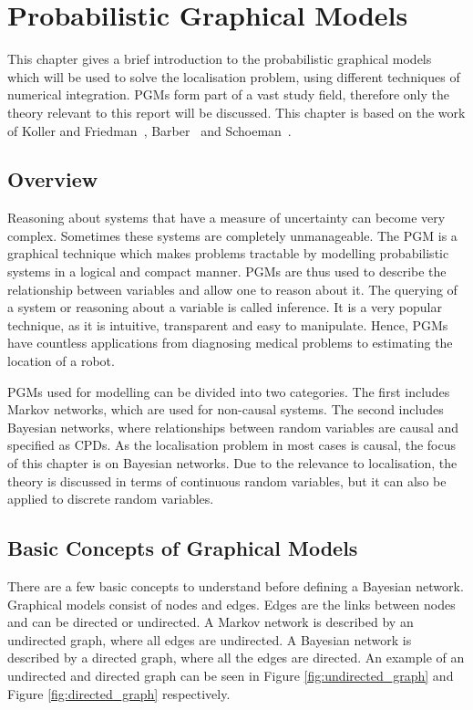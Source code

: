 \documentclass[12pt,oneside,openany,a4paper, %
afrikaans,english,
]{memoir}
\numberwithin{equation}{chapter}
\begin{document}
\chapter{Probabilistic Graphical Models}
This chapter gives a brief introduction to the probabilistic graphical models which will be used to solve the localisation problem, using different techniques of numerical integration. PGMs form part of a vast study field, therefore only the theory relevant to this report will be discussed. This chapter is based on the work of Koller and Friedman~\cite{koller}, Barber~\cite{barber} and Schoeman~\citep{JC}.
\section{Overview}
Reasoning about systems that have a measure of uncertainty can become very complex. Sometimes these systems are completely unmanageable. The PGM is a graphical technique which makes problems tractable by modelling probabilistic systems in a logical and compact manner. PGMs are thus used to describe the relationship between variables and allow one to reason about it. The querying of a system or reasoning about a variable is called inference. It is a very popular technique, as it is intuitive, transparent and easy to manipulate. Hence, PGMs have countless applications from diagnosing medical problems to estimating the location of a robot.

PGMs used for modelling can be divided into two categories. The first includes Markov networks, which are used for non-causal systems. The second includes Bayesian networks, where relationships between random variables are causal and specified as CPDs. As the localisation problem in most cases is causal, the focus of this chapter is on Bayesian networks. Due to the relevance to localisation, the theory is discussed in terms of continuous random variables, but it can also be applied to discrete random variables. 
\section{Basic Concepts of Graphical Models}
There are a few basic concepts to understand before defining a Bayesian network. Graphical models consist of nodes and edges. Edges are the links between nodes and can be directed or undirected. A Markov network is described by an undirected graph, where all edges are undirected. A Bayesian network is described by a directed graph, where all the edges are directed. An example of an undirected and directed graph can be seen in Figure \ref{fig:undirected_graph} and Figure \ref{fig:directed_graph} respectively.
\end{document}

